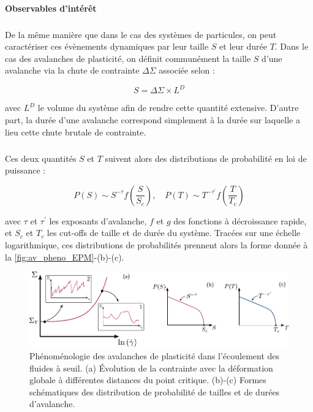 \paragraph{Observables d'intérêt}

\subparagraph{}De la même manière que dans le cas des systèmes de particules, on peut caractériser ces évènements dynamiques par leur taille $S$ et leur durée $T$. Dans le cas des avalanches de plasticité, on définit communément la taille $S$ d'une avalanche via la chute de contrainte $\Delta\Sigma$ associée selon :

\begin{equation}
	S = \Delta\Sigma\times L^D
\end{equation}

\noindent avec $L^D$ le volume du système afin de rendre cette quantité extensive. D'autre part, la durée d'une avalanche correspond simplement à la durée sur laquelle a lieu cette chute brutale de contrainte.

\subparagraph{}Ces deux quantités $S$ et $T$ suivent alors des distributions de probabilité en loi de puissance :

\begin{equation}
	P(S) \sim S^{-\tau}f\left( \frac{S}{S_c} \right), \quad P(T) \sim T^{-\tau^\prime}f\left( \frac{T}{T_c} \right)
	\label{eq:AvalancheDistrib}
\end{equation}

\noindent avec $\tau$ et $\tau^\prime$ les exposants d'avalanche, $f$ et $g$ des fonctions à décroissance rapide, et $S_c$ et $T_c$ les cut-offs de taille et de durée du système. Tracées sur une échelle logarithmique, ces distributions de probabilités prennent alors la forme donnée à la \autoref{fig:av_pheno_EPM}-(b)-(c).

\begin{figure}[h]
	\centering
	\includegraphics[width=\textwidth]{Chapitre4/Figures/Avalanches/Pheno.pdf}
	\caption{Phénoménologie des avalanches de plasticité dans l'écoulement des fluides à seuil. (a) Évolution de la contrainte avec la déformation globale à différentes distances du point critique. (b)-(c) Formes schématiques des distribution de probabilité de tailles et de durées d'avalanche.}
	\label{fig:av_pheno_EPM}
\end{figure}

